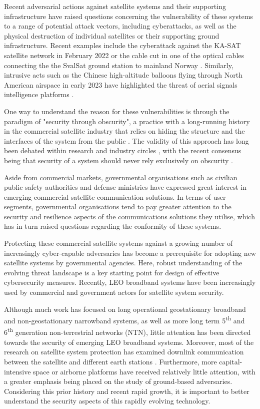 \documentclass[english, 12pt, a4paper, elec, utf8, a-1b, online]{aaltothesis}
\begin{document}
Recent adversarial actions against satellite systems and their supporting infrastructure have raised questions concerning the vulnerability of these systems to a range of potential attack vectors, including cyberattacks, as well as the physical destruction of individual satellites or their supporting ground infrastructure.
Recent examples include the cyberattack against the KA-SAT satellite network in February 2022 \cite{boschetti2022space} or the cable cut in one of the optical cables connecting the the SvalSat ground station to mainland Norway \cite{schia2023subsea}.
Similarly, intrusive acts such as the Chinese high-altitude balloons flying through North American airspace in early 2023 have highlighted the threat of aerial signals intelligence platforms \cite{wip}.

One way to understand the reason for these vulnerabilities is through the paradigm of "security through obscurity", a practice with a long-running history in the commercial satellite industry that relies on hiding the structure and the interfaces of the system from the public \cite{lin2022defending}.
The validity of this approach has long been debated within research and industry circles \cite{johansson2008great}, with the recent consensus being that security of a system should never rely exclusively on obscurity \cite{diehl2016law, guo2018defending}.

Aside from commercial markets, governmental organisations such as civilian public safety authorities and defense ministries have expressed great interest in emerging commercial satellite communication solutions.
In terms of user segments, governmental organisations tend to pay greater attention to the security and resilience aspects of the communications solutions they utilise, which has in turn raised questions regarding the conformity of these systems.

Protecting these commercial satellite systems against a growing number of increasingly cyber-capable adversaries has become a prerequisite for adopting new satellite systems by governmental agencies.
Here, robust understanding of the evolving threat landscape is a key starting point for design of effective cybersecurity measures.
Recently, LEO broadband systems have been increasingly used by commercial and government actors for satellite system security.

Although much work has focused on long operational geostationary broadband and non-geostationary narrowband systems, as well as more long term 5\textsuperscript{th} and 6\textsuperscript{th} generation non-terrestrial networks (NTN), little attention has been directed towards the security of emerging LEO broadband systems.
Moreover, most of the research on satellite system protection has examined downlink communication between the satellite and different earth stations \cite{abdelsalam2023physical}.
Furthermore, more capital-intensive space or airborne platforms have received relatively little attention, with a greater emphasis being placed on the study of ground-based adversaries.
Considering this prior history and recent rapid growth, it is important to better understand the security aspects of this rapidly evolving technology. 
\end{document}
